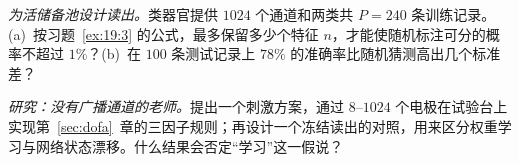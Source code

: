 \begin{exercise}[\lvlB]
\label{ex:21:6}
\emph{为活储备池设计读出。}类器官提供 $1024$ 个通道和两类共 $P=240$ 条训练记录。(a)~按习题~\ref{ex:19:3} 的公式，最多保留多少个特征 $n$，才能使随机标注可分的概率不超过 $1\%$？(b)~在 $100$ 条测试记录上 $78\%$ 的准确率比随机猜测高出几个标准差？
\end{exercise}

\begin{exercise}[\lvlC]
\label{ex:21:7}
\emph{研究：没有广播通道的老师。}提出一个刺激方案，通过 $8$--$1024$ 个电极在试验台上实现第~\ref{sec:dofa}~章的三因子规则；再设计一个冻结读出的对照，用来区分权重学习与网络状态漂移。什么结果会否定“学习”这一假说？
\end{exercise}
